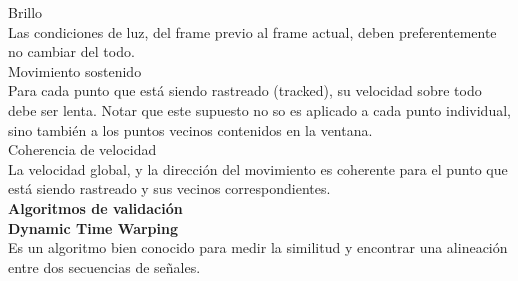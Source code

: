 Brillo\\
Las condiciones de luz, del frame previo al frame actual, deben preferentemente no cambiar del todo. \\

Movimiento sostenido\\
Para cada punto que está siendo rastreado (tracked), su velocidad sobre todo debe ser lenta. Notar que este supuesto no so es aplicado a cada punto individual, sino también a los puntos vecinos contenidos en la ventana.\\

Coherencia de velocidad\\
La velocidad global, y la dirección del movimiento es coherente para el punto que está siendo rastreado y sus vecinos correspondientes.\\

\textbf{\large{Algoritmos de validación}}\cite{validacion}\\

\textbf{Dynamic Time Warping}\\

Es un algoritmo bien conocido para medir la similitud y encontrar una alineación entre dos secuencias de señales. 

